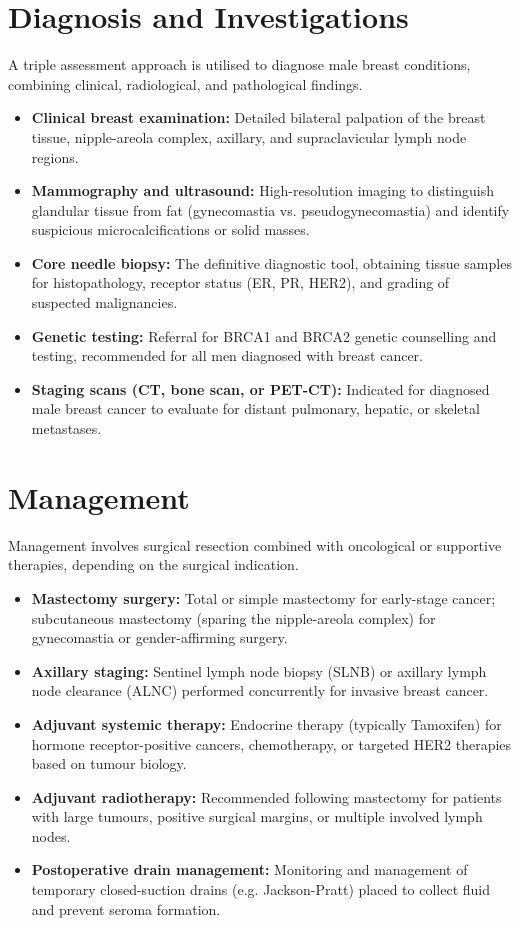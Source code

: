 \section*{Diagnosis and Investigations}
A triple assessment approach is utilised to diagnose male breast conditions, combining clinical, radiological, and pathological findings.
\begin{itemize}
    \item \textbf{Clinical breast examination:} Detailed bilateral palpation of the breast tissue, nipple-areola complex, axillary, and supraclavicular lymph node regions.
    \item \textbf{Mammography and ultrasound:} High-resolution imaging to distinguish glandular tissue from fat (gynecomastia vs. pseudogynecomastia) and identify suspicious microcalcifications or solid masses.
    \item \textbf{Core needle biopsy:} The definitive diagnostic tool, obtaining tissue samples for histopathology, receptor status (ER, PR, HER2), and grading of suspected malignancies.
    \item \textbf{Genetic testing:} Referral for BRCA1 and BRCA2 genetic counselling and testing, recommended for all men diagnosed with breast cancer.
    \item \textbf{Staging scans (CT, bone scan, or PET-CT):} Indicated for diagnosed male breast cancer to evaluate for distant pulmonary, hepatic, or skeletal metastases.
\end{itemize}

\section*{Management}
Management involves surgical resection combined with oncological or supportive therapies, depending on the surgical indication.
\begin{itemize}
    \item \textbf{Mastectomy surgery:} Total or simple mastectomy for early-stage cancer; subcutaneous mastectomy (sparing the nipple-areola complex) for gynecomastia or gender-affirming surgery.
    \item \textbf{Axillary staging:} Sentinel lymph node biopsy (SLNB) or axillary lymph node clearance (ALNC) performed concurrently for invasive breast cancer.
    \item \textbf{Adjuvant systemic therapy:} Endocrine therapy (typically Tamoxifen) for hormone receptor-positive cancers, chemotherapy, or targeted HER2 therapies based on tumour biology.
    \item \textbf{Adjuvant radiotherapy:} Recommended following mastectomy for patients with large tumours, positive surgical margins, or multiple involved lymph nodes.
    \item \textbf{Postoperative drain management:} Monitoring and management of temporary closed-suction drains (e.g. Jackson-Pratt) placed to collect fluid and prevent seroma formation.
\end{itemize}

